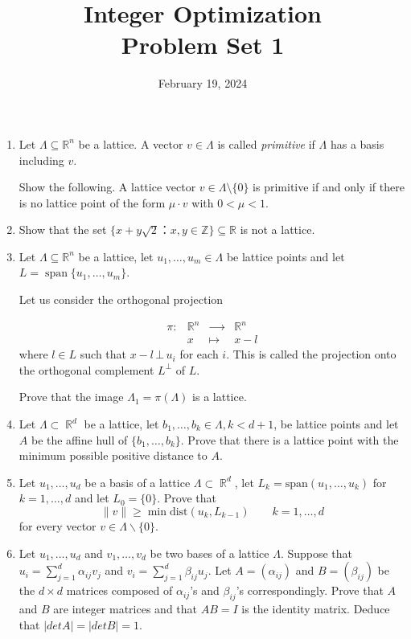 \documentclass[11pt,a4paper]{article}
\title{Integer Optimization  \\ Problem Set 1 }
\date{February 19, 2024}
\DeclareMathOperator{\Spa}{span}
\DeclareMathOperator{\RR}{\mathbb{R}}
\begin{document}
\maketitle 




\begin{enumerate} 
\item

  Let $Λ ⊆ ℝ^n$ be a lattice. A vector $v ∈ Λ$ is called \emph{primitive} if $Λ$ has a basis including $v$.

  \medskip

  Show the following. A lattice vector $v ∈ Λ \setminus \{0\}$ is primitive  if and only if there is no lattice point of the form $μ ⋅ v$ with $0<μ<1$.

\item Show that the set $ \{ x + y \sqrt{2} ： x,y ∈ ℤ \} ⊆ ℝ$ is not a lattice.

\item Let $Λ ⊆ ℝ^n$  be a lattice, let $u_1 ,\dots ,u_m  ∈ Λ$  be lattice points and let
  $ L = \Spa \{u_1, \dots , u_m\}$.


  Let us consider the orthogonal projection

  \begin{displaymath}
    \begin{array}{rccc}      
      π : & ℝ^ n &  ⟶ &  ℝ^ n \\
          & x & ↦       & x-l 
          \end{array}
        \end{displaymath}
where $l ∈ L$ such that  $x-l \, ⊥\,  u_i$ for each $i$.         
This is called the projection onto the orthogonal complement $L^⊥$ of $L$.

Prove that the image $Λ_1 = π(Λ)$  is a lattice.


\item Let $Λ ⊂ \RR^d$ be a lattice, let $b_1, \hdots ,b_k ∈ Λ, k < d+1$, be lattice points and let $A$ be the affine hull of $\{b_1, \hdots , b_k\}$. Prove that there is a lattice point with the minimum possible positive distance to $A$.

\item Let $u_1,\hdots ,u_d$ be a basis of a lattice $Λ ⊂ \RR^d$, let $L_k = \text{span}( u_1, \hdots ,u_k)$ for $k = 1, \hdots ,d$ and let $L_0 = \{0\}$. Prove that
$$∥v∥ ≥ \min \text{dist}(u_k, L_{k−1}) \qquad k=1,\hdots ,d$$
for every vector $v ∈ Λ \backslash \{0\}$.

\item Let $u_1, \hdots ,u_d$ and $v_1, \hdots ,v_d$ be two bases of a lattice $Λ$. Suppose that $u_i = \sum_{j =1}^d α_{ij}v_j$ and $v_i = \sum_{j =1}^d β_{ij}u_j$. Let $A = (α_{ij})$ and $B = (β_{ij})$ be the $d × d$ matrices composed of $α_{ij}$’s and $β_{ij}$’s correspondingly. Prove that $A$ and $B$ are integer matrices and that $AB = I$ is the identity matrix. Deduce that $| det A| = | det B| = 1$.
  

  

\end{enumerate}



%
%


 
\end{document}
